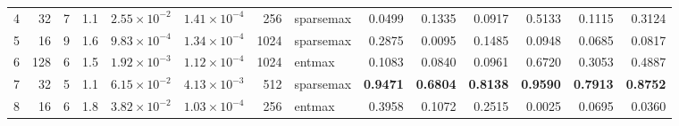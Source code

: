 \begin{table}[htbp]
{\begin{tabular}{lrrrrrrl rrr rrr}
    4 & 32  & 7  & 1.1 & \(2.55\times10^{-2}\) & \(1.41\times10^{-4}\) & 256  & sparsemax & 0.0499 & 0.1335 & 0.0917 & 0.5133 & 0.1115 & 0.3124 \\
    5 & 16  & 9  & 1.6 & \(9.83\times10^{-4}\) & \(1.34\times10^{-4}\) & 1024 & sparsemax & 0.2875 & 0.0095 & 0.1485 & 0.0948 & 0.0685 & 0.0817 \\
    6 & 128 & 6  & 1.5 & \(1.92\times10^{-3}\) & \(1.12\times10^{-4}\) & 1024 & entmax    & 0.1083 & 0.0840 & 0.0961 & 0.6720 & 0.3053 & 0.4887 \\
    7 & 32  & 5  & 1.1 & \(6.15\times10^{-2}\) & \(4.13\times10^{-3}\) & 512  & sparsemax & \textbf{0.9471} & \textbf{0.6804} & \textbf{0.8138} & \textbf{0.9590} & \textbf{0.7913} & \textbf{0.8752} \\
    8 & 16  & 6  & 1.8 & \(3.82\times10^{-2}\) & \(1.03\times10^{-4}\) & 256  & entmax    & 0.3958 & 0.1072 & 0.2515 & 0.0025 & 0.0695 & 0.0360 \\
    \bottomrule
  \end{tabular}%
  }
\end{table}

